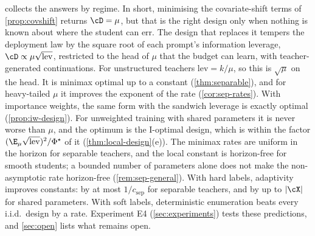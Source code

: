  collects the answers by regime. In short, minimising the covariate-shift terms of \cref{prop:covshift} returns $\cD=\mu$, but that is the
right design only when nothing is known about where the student can err. The design that replaces
it tempers the deployment law by the square root of each prompt's information leverage,
$\cD\propto\mu\sqrt{\mathrm{lev}}$, restricted to the head of $\mu$ that the budget can learn, with teacher-generated
continuations. For unstructured teachers $\mathrm{lev}=k/\mu$, so this is $\sqrt\mu$ on the head. It is minimax
optimal up to a constant (\cref{thm:separable}), and for heavy-tailed $\mu$ it improves the exponent of the
rate (\cref{cor:sep-rates}). With importance weights, the same form with the sandwich leverage is exactly
optimal (\cref{prop:iw-design}). For
unweighted training with shared parameters it is never worse than $\mu$, and the optimum is the I-optimal
design, which is within the factor $(\E_\mu\sqrt{\mathrm{lev}})^2/\Phi^\star$ of it (\cref{thm:local-design}(e)). The
minimax rates are uniform in the horizon for separable teachers, and the local constant is
horizon-free for smooth students; a bounded number of parameters alone does not make the
non-asymptotic rate horizon-free (\cref{rem:sep-general}). With hard labels, adaptivity improves
constants: by at most $1/c_{\mathrm{sep}}$ for separable teachers, and by up to $|\cX|$ for shared parameters.
With soft labels, deterministic enumeration beats every i.i.d.\ design by a rate. Experiment E4
(\cref{sec:experiments}) tests these predictions, and \cref{sec:open} lists what remains open.
